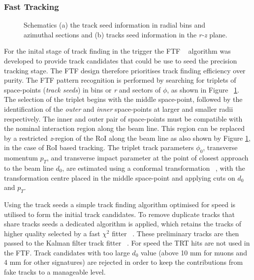 		\subsubsection*{Fast Tracking}
		\begin{figure}[!htb]
	\begin{center}
		\hspace{0.05\textwidth}
		\hspace{0.05\textwidth}
	\end{center}	
	\caption{Schematics (a) the track seed information in radial bins and azimuthal sections and (b) tracks seed information in the \textit{r-z} plane.}
	\label{fig:schem_FTF}
	\end{figure}	 
	\noindent For the inital stage of track finding in the trigger the \ac{FTF} ~\cite{ATL-DAQ-PUB-2013-002} algorithm was developed to provide track candidates that could be use to seed the precision tracking stage. The \ac{FTF} design therefore prioritises track finding efficiency over purity. The \ac{FTF} pattern recognition is performed by searching for triplets of space-points (\textit{track seeds}) in bins or \textit{r} and sectors of $\phi$, as shown in Figure ~\ref{fig:schem_FTF}. 
	The selection of the triplet begins with the middle space-point, followed by the identification of the \textit{outer} and \textit{inner} space-points at larger and smaller radii respectively. The inner and outer pair of space-points must be compatible with the nominal interaction region along the beam line. 
	This region can be replaced by a restricted \textit{z}-region of the \ac{RoI} along the beam line as also shown by Figure \ref{fig:schem_FTF}, in the case of \ac{RoI} based tracking. 
	The triplet track parameters $\phi_0$, transverse momentum $p_T$, and transverse impact parameter at the point of closest approach to the beam line $d_0$, are estimated using a conformal transformation ~\cite{YEPES1996582}, with the transformation centre placed in the middle space-point and applying cuts on $d_0$ and $p_T$.
	
	Using the track seeds a simple track finding algorithm optimised for speed is utilised to form the initial track candidates. To remove duplicate tracks that share tracks seeds a dedicated algorithm is applied, which retains the tracks of higher quality selected by a fast $\chi^2$ fitter ~\cite{SUTTON2007761}. These preliminary tracks are then passed to the Kalman filter track fitter ~\cite{Kalman1987}. For speed the \ac{TRT} hits are not used in the \ac{FTF}.  Track candidates with too large $d_0$ value (\ie above 10 mm for muons and 4 mm for other signatures) are rejected in order to keep the contributions from fake tracks to a manageable level.
	
